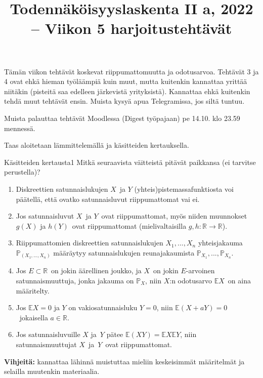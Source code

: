 \documentclass[11pt,a4paper]{amsart}
\title{Todennäköisyyslaskenta II a, 2022 -- Viikon 5 harjoitustehtävät}
\newcommand{\R}{\mathbb{R}}
\newcommand{\E}{\mathbb{E}}
\newcommand{\1}{\mathbf{1}}
\renewcommand{\P}{\mathbb P}
\begin{document}
\maketitle

Tämän viikon tehtävät koskevat riippumattomuutta ja odotusarvoa. Tehtävät 3 ja 4 ovat ehkä hieman työläämpiä kuin muut, mutta kuitenkin kannattaa yrittää niitäkin (pisteitä saa edelleen järkevistä yrityksistä). Kannattaa ehkä kuitenkin tehdä muut tehtävät ensin. Muista kysyä apua Telegramissa, jos siltä tuntuu.

Muista palauttaa tehtävät  Moodlessa (Digest työpajaan) pe 14.10. klo 23.59 mennessä.

\medskip 

Taas aloitetaan lämmittelemällä ja käsitteiden kertauksella. 
\begin{Exercises}{Käsitteiden kertausta}{1}
Mitkä seuraavista väitteistä pitävät paikkansa (ei tarvitse perustella)? 
\begin{enumerate}
\item  Diskreettien satunnaislukujen $X$ ja $Y$ (yhteis)pistemassafunktiosta voi päätellä, että ovatko satunnaisluvut riippumattomat vai ei.
 
\item Jos satunnaisluvut $X$ ja $Y$ ovat riippumattomat, myös niiden muunnokset $g(X)$ ja $h(Y)$ ovat riippumattomat (mielivaltaisilla $g,h:\R\to \R$). 

 
\item Riippumattomien diskreettien satunnaislukujen $X_1,...,X_n$ yhteisjakauma $\P_{(X_1,...,X_n)}$ määräytyy satunnaislukujen reunajakaumista $\P_{X_1},...,\P_{X_n}$.

 

\item Jos $E\subset \R$ on jokin äärellinen joukko, ja $X$ on jokin $E$-arvoinen satunnaismuuttuja, jonka jakauma on $\P_X$, niin $X$:n odotusarvo $\E X$ on aina määritelty.  

 
\item Jos $\E X=0$ ja $Y$ on vakiosatunnaisluku $Y=0$, niin $\E (X+aY)=0$ jokaisella $a\in \R$.

 
\item Jos satunnaisluvuille $X$ ja $Y$ pätee $\E(XY)=\E X \E Y$, niin satunnaismuuttujat $X$ ja $Y$ ovat riippumattomat.

 
\end{enumerate}
{\bf Vihjeitä:} kannattaa lähinnä muistuttaa mieliin keskeisimmät määritelmät ja selailla muutenkin materiaalia. 
\end{Exercises}
\end{document}
